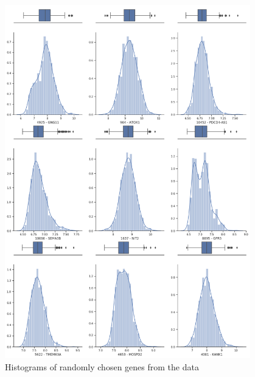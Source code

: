 \documentclass[12pt, wide]{mwart}
\begin{document}
\begin{figure}
\centering
\includegraphics[width=0.95\textwidth]{images/hists_normal.png}
\caption{Histograms of randomly chosen genes from the data}
\label{fig:hists_norm}
\end{figure}
\end{document}
